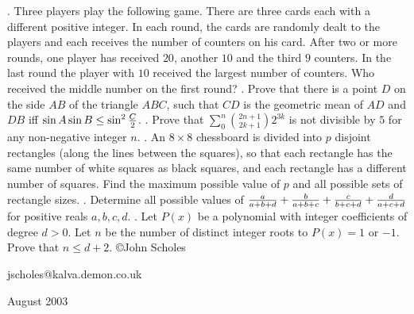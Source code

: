 \nopagenumbers
{}
\vskip 25pt
. Three players play the following game. There are three cards each with a different positive integer. In each round, the cards are randomly dealt to the players and each receives the number of counters on his card. After two or more rounds, one player has received $20$, another $10$ and the third $9$ counters. In the last round the player with $10$ received the largest number of counters. Who received the middle number on the first round?
\vskip 12pt
. Prove that there is a point $D$ on the side $AB$ of the triangle $ABC$, such that $CD$ is the geometric mean of $AD$ and $DB$ iff $\sin A\sin B\le\sin^2{C\over2}$.
\vskip 12pt
. Prove that $\sum_0^n{2n+1\choose2k+1}2^{3k}$ is not divisible by $5$ for any non-negative integer $n$.
\vskip 12pt
. An $8\times8$ chessboard is divided into $p$ disjoint rectangles (along the lines between the squares), so that each rectangle has the same number of white squares as black squares, and each rectangle has a different number of squares. Find the maximum possible value of $p$ and all possible sets of rectangle sizes.
\vskip 12pt
. Determine all possible values of ${a\over a+b+d}+{b\over a+b+c}+{c\over b+c+d}+{d\over a+c+d}$ for positive reals $a,b,c,d$.
\vskip 12pt
. Let $P(x)$ be a polynomial with integer coefficients of degree $d>0$. Let $n$ be the number of distinct integer roots to $P(x)=1$ or $-1$. Prove that $n\le d+2$.
\vskip 20pt
\noindent \copyright John Scholes

\noindent jscholes@kalva.demon.co.uk

 August 2003

\bye
